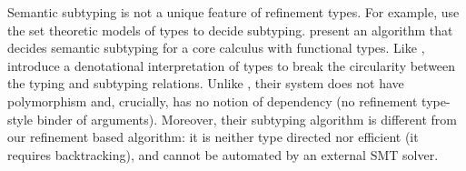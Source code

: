   Semantic subtyping is not a unique feature of refinement types. 
  For example, \citet{Castagna02} use the set theoretic models of types 
  to decide subtyping. 
  \citet{Castagna05} present an algorithm that decides semantic subtyping 
  for a core calculus with functional types. 
  Like \sysrf, \citet{Castagna05} introduce a denotational interpretation of types 
  to break the circularity between the typing and subtyping relations.
  Unlike \sysrf, their system does not have polymorphism and, crucially, has no notion of dependency
  (no refinement type-style binder of arguments).
  Moreover, their subtyping algorithm is different from our refinement based algorithm:
  it is neither type directed nor efficient (\ie it requires backtracking), and
  cannot be automated by an external SMT solver. 

